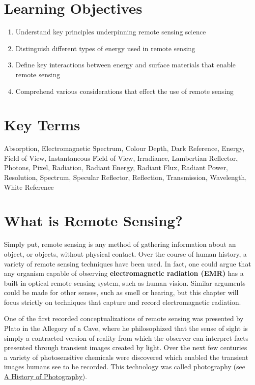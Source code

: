 \documentclass[
]{book}
\providecommand{\tightlist}{%
  \setlength{\itemsep}{0pt}\setlength{\parskip}{0pt}}
\begin{document}
\section*{Learning Objectives}\label{learning-objectives-8}

\begin{enumerate}
\def\labelenumi{\arabic{enumi}.}
\tightlist
\item
  Understand key principles underpinning remote sensing science
\item
  Distinguish different types of energy used in remote sensing
\item
  Define key interactions between energy and surface materials that enable remote sensing
\item
  Comprehend various considerations that effect the use of remote sensing
\end{enumerate}

\section*{Key Terms}\label{key-terms-8}

Absorption, Electromagnetic Spectrum, Colour Depth, Dark Reference, Energy, Field of View, Instantaneous Field of View, Irradiance, Lambertian Reflector, Photons, Pixel, Radiation, Radiant Energy, Radiant Flux, Radiant Power, Resolution, Spectrum, Specular Reflector, Reflection, Transmission, Wavelength, White Reference

\section{What is Remote Sensing?}\label{what-is-remote-sensing}

Simply put, remote sensing is any method of gathering information about an object, or objects, without physical contact. Over the course of human history, a variety of remote sensing techniques have been used. In fact, one could argue that any organism capable of observing \textbf{electromagnetic radiation (EMR)} has a built in optical remote sensing system, such as human vision. Similar arguments could be made for other senses, such as smell or hearing, but this chapter will focus strictly on techniques that capture and record electromagnetic radiation.

One of the first recorded conceptualizations of remote sensing was presented by Plato in the Allegory of a Cave, where he philosophized that the sense of sight is simply a contracted version of reality from which the observer can interpret facts presented through transient images created by light. Over the next few centuries a variety of photosensitive chemicals were discovered which enabled the transient images humans see to be recorded. This technology was called photography (see \href{https://www.scienceandmediamuseum.org.uk/objects-and-stories/history-photography}{A History of Photography}).
\end{document}
